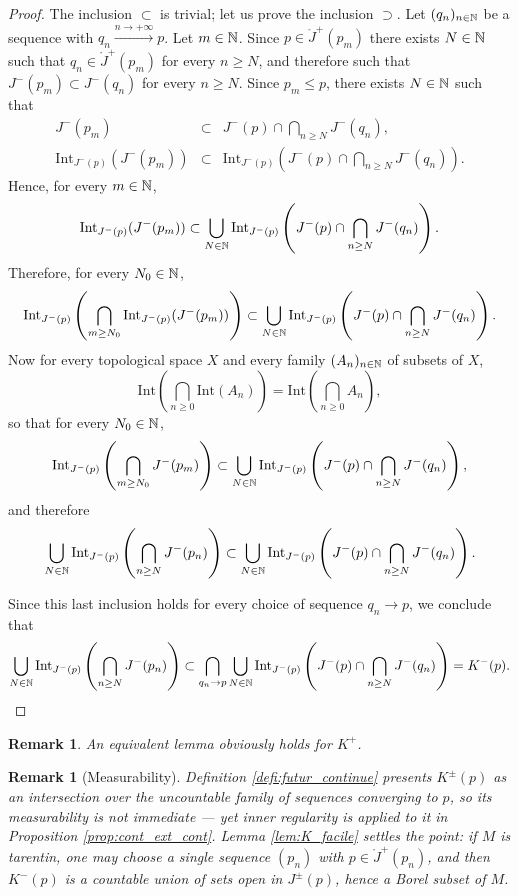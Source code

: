 \documentclass[a4paper,twoside]{article}
\newtheorem{rem}[lem]{Remark}
\begin{document}
\begin{proof}
The inclusion $\subset$ is trivial; let us prove the inclusion $\supset$. Let $(q_n)_{n\in \mathbb{N}}$ be a sequence with
$q_n \xrightarrow{n\rightarrow +\infty} p$.
Let $m\in \mathbb{N}$. Since $p\in \ring J^+(p_m)$ there exists $N\in \mathbb{N}$ such that $q_n \in \ring J^+(p_m)$ for every $n\geq N$, and therefore such that
$J^-(p_m)\subset J^-(q_n)$ for every $n\geq N$.
Since $p_m\leq p$, there exists $N\in \mathbb{N}$ such that
\begin{eqnarray*} J^-(p_m) &\subset& J^-(p)\cap \bigcap_{n\geq N} J^-(q_n), \\
\mathrm{Int}_{J^-(p)}( J^-(p_m)) &\subset&  \mathrm{Int}_{J^-(p)}\left( J^-(p)\cap \bigcap_{n\geq N} J^-(q_n) \right).
\end{eqnarray*}
Hence, for every $m\in \mathbb{N}$,
$$  \mathrm{Int}_{J^-(p)}( J^-(p_m)) \subset \bigcup_{N\in \mathbb{N}}
\mathrm{Int}_{J^-(p)}\left( J^-(p)\cap \bigcap_{n\geq N} J^-(q_n) \right).$$
Therefore, for every $N_0\in \mathbb{N}$,
$$\mathrm{Int}_{J^-(p)}\left( \bigcap_{m\geq N_0} \mathrm{Int}_{J^-(p)}( J^-(p_m))\right) \subset \bigcup_{N\in \mathbb{N}} \mathrm{Int}_{J^-(p)}\left( J^-(p)\cap \bigcap_{n\geq N} J^-(q_n) \right).$$
Now for every topological space $X$ and every family $(A_n)_{n\in \mathbb{N}}$ of subsets of $X$,
$$\mathrm{Int} \left( \bigcap_{n\geq 0} \mathrm{Int}(A_n)\right) = \mathrm{Int}\left( \bigcap_{n\geq 0} A_n\right),$$
so that for every $N_0\in \mathbb{N}$,
$$\mathrm{Int}_{J^-(p)}\left( \bigcap_{m\geq N_0}  J^-(p_m)\right) \subset \bigcup_{N\in \mathbb{N}} \mathrm{Int}_{J^-(p)}\left( J^-(p)\cap \bigcap_{n\geq N} J^-(q_n) \right),$$
and therefore
$$\bigcup_{N\in \mathbb{N}}\mathrm{Int}_{J^-(p)}\left( \bigcap_{n\geq N}  J^-(p_n)\right) \subset \bigcup_{N\in \mathbb{N}} \mathrm{Int}_{J^-(p)}\left( J^-(p)\cap \bigcap_{n\geq N} J^-(q_n) \right).$$

Since this last inclusion holds for every choice of sequence $q_n\rightarrow p$, we conclude that
$$\bigcup_{N\in \mathbb{N}}\mathrm{Int}_{J^-(p)}\left( \bigcap_{n\geq N}  J^-(p_n)\right) \subset \bigcap_{q_n\rightarrow p} \bigcup_{N\in \mathbb{N}} \mathrm{Int}_{J^-(p)}\left( J^-(p)\cap \bigcap_{n\geq N} J^-(q_n) \right)=K^-(p).$$
\end{proof}
\begin{rem}\label{rem:equivalent_lemma_obviously_holds} An equivalent lemma obviously holds for $K^+$.
\end{rem}
\begin{rem}[Measurability]\label{rem:K_borelien}
Definition \ref{defi:futur_continue} presents $K^\pm(p)$ as an intersection over the \emph{uncountable}
family of sequences converging to $p$, so its measurability is not immediate --- yet inner regularity
is applied to it in Proposition \ref{prop:cont_ext_cont}. Lemma \ref{lem:K_facile} settles the point:
if $M$ is tarentin, one may choose a single sequence $(p_n)$ with $p\in \ring J^+(p_n)$, and then
$K^-(p)$ is a countable union of sets open in $J^\pm(p)$, hence a Borel subset of $M$.
\end{rem}
\end{document}
